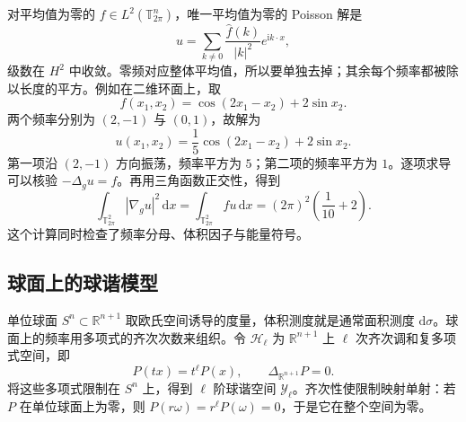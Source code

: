 对平均值为零的 \(f\in L^2(\mathbb T_{2\pi}^n)\)，唯一平均值为零的 Poisson 解是
\[
 u=\sum_{k\ne0}\frac{\widehat f(k)}{|k|^2}e^{\mathrm ik\cdot x},
\]
级数在 \(H^2\) 中收敛。零频对应整体平均值，所以要单独去掉；其余每个频率都被除以长度的平方。例如在二维环面上，取
\[
 f(x_1,x_2)=\cos(2x_1-x_2)+2\sin x_2.
\]
两个频率分别为 \((2,-1)\) 与 \((0,1)\)，故解为
\[
 u(x_1,x_2)=\frac15\cos(2x_1-x_2)+2\sin x_2.
\]
第一项沿 \((2,-1)\) 方向振荡，频率平方为 \(5\)；第二项的频率平方为 \(1\)。逐项求导可以核验 \(-\Delta_g u=f\)。再用三角函数正交性，得到
\[
 \int_{\mathbb T_{2\pi}^2}|\nabla_g u|^2\,\mathrm dx
 =\int_{\mathbb T_{2\pi}^2}fu\,\mathrm dx
 =(2\pi)^2\left(\frac1{10}+2\right).
\]
这个计算同时检查了频率分母、体积因子与能量符号。

\subsection{球面上的球谐模型}
\label{b2:subsec:260602}

单位球面 \(S^n\subset\mathbb R^{n+1}\) 取欧氏空间诱导的度量，体积测度就是通常面积测度 \(\mathrm d\sigma\)。球面上的频率用多项式的齐次次数来组织。令 \(\mathcal H_\ell\) 为 \(\mathbb R^{n+1}\) 上 \(\ell\) 次齐次调和复多项式空间，即
\[
 P(tx)=t^\ell P(x),\qquad \Delta_{\mathbb R^{n+1}}P=0.
\]
将这些多项式限制在 \(S^n\) 上，得到 \(\ell\) 阶球谐空间 \(\mathcal Y_\ell\)。齐次性使限制映射单射：若 \(P\) 在单位球面上为零，则 \(P(r\omega)=r^\ell P(\omega)=0\)，于是它在整个空间为零。

